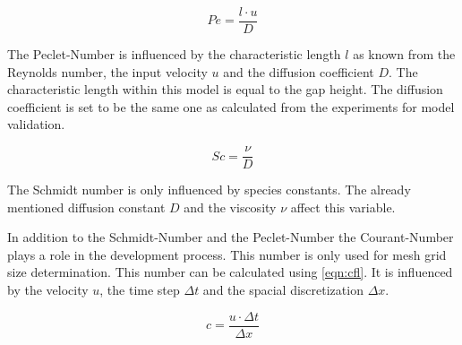 \documentclass[../thesis.tex]{subfiles}
\begin{document}
\begin{equation}
	\label{eqn: Pe}
	Pe = \dfrac{l \cdot u}{D}
\end{equation}

The Peclet-Number is influenced by the characteristic length $l$ as known from the Reynolds number, the input velocity $u$ and the diffusion coefficient $D$. The characteristic length within this model is equal to the gap height. The diffusion coefficient is set to be the same one as calculated from the experiments for model validation. 

\begin{equation}
	\label{eqn: Sc}
	Sc = \dfrac{\nu}{D}
\end{equation}

The Schmidt number is only influenced by species constants. The already mentioned diffusion constant $D$ and the viscosity $\nu$ affect this variable.

In addition to the Schmidt-Number and the Peclet-Number the Courant-Number plays a role in the development process. This number is only used for mesh grid size determination. This number can be calculated using \autoref{eqn:cfl}. It is influenced by the velocity $u$, the time step $ \Delta t$ and the spacial discretization $\Delta x$.

\begin{equation}
	\label{eqn:cfl}
	c = \dfrac{u \cdot \Delta t}{\Delta x}
\end{equation}
\end{document}
